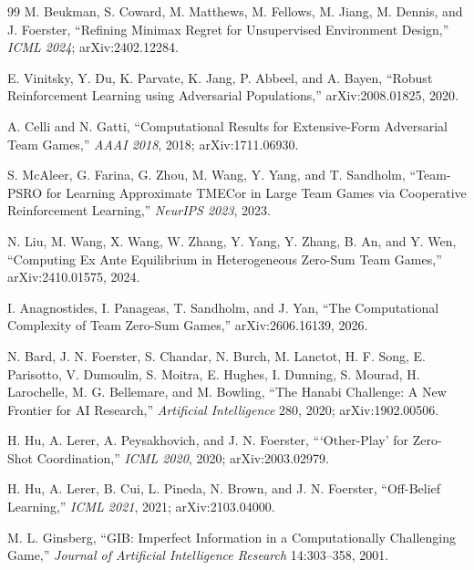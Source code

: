 \begin{thebibliography}{99}
M. Beukman, S. Coward, M. Matthews, M. Fellows, M. Jiang, M. Dennis, and
J. Foerster, ``Refining Minimax Regret for Unsupervised Environment Design,''
\emph{ICML 2024}; arXiv:2402.12284.

E. Vinitsky, Y. Du, K. Parvate, K. Jang, P. Abbeel, and A. Bayen, ``Robust
Reinforcement Learning using Adversarial Populations,'' arXiv:2008.01825, 2020.


A. Celli and N. Gatti, ``Computational Results for Extensive-Form Adversarial
Team Games,'' \emph{AAAI 2018}, 2018; arXiv:1711.06930.

S. McAleer, G. Farina, G. Zhou, M. Wang, Y. Yang, and T. Sandholm, ``Team-PSRO
for Learning Approximate TMECor in Large Team Games via Cooperative
Reinforcement Learning,'' \emph{NeurIPS 2023}, 2023.

N. Liu, M. Wang, X. Wang, W. Zhang, Y. Yang, Y. Zhang, B. An, and Y. Wen,
``Computing Ex Ante Equilibrium in Heterogeneous Zero-Sum Team Games,''
arXiv:2410.01575, 2024.

I. Anagnostides, I. Panageas, T. Sandholm, and J. Yan, ``The Computational
Complexity of Team Zero-Sum Games,'' arXiv:2606.16139, 2026.

N. Bard, J. N. Foerster, S. Chandar, N. Burch, M. Lanctot, H. F. Song,
E. Parisotto, V. Dumoulin, S. Moitra, E. Hughes, I. Dunning, S. Mourad,
H. Larochelle, M. G. Bellemare, and M. Bowling, ``The Hanabi Challenge: A New
Frontier for AI Research,'' \emph{Artificial Intelligence} 280, 2020;
arXiv:1902.00506.

H. Hu, A. Lerer, A. Peysakhovich, and J. N. Foerster, ```Other-Play' for
Zero-Shot Coordination,'' \emph{ICML 2020}, 2020; arXiv:2003.02979.

H. Hu, A. Lerer, B. Cui, L. Pineda, N. Brown, and J. N. Foerster, ``Off-Belief
Learning,'' \emph{ICML 2021}, 2021; arXiv:2103.04000.


M. L. Ginsberg, ``GIB: Imperfect Information in a Computationally Challenging
Game,'' \emph{Journal of Artificial Intelligence Research} 14:303--358, 2001.


\end{thebibliography}
